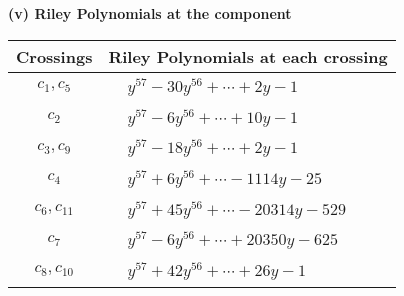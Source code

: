 \documentclass[1p]{elsarticle_modified}
\theoremstyle{definition}
\begin{document}
\newpage\renewcommand{\arraystretch}{1}
\flushleft \textbf{(v) Riley Polynomials at the component}\newline \\
\begin{tabular}{m{50pt}|m{274pt}}
Crossings & \hspace{64pt}Riley Polynomials at each crossing \\
\hline $$\begin{aligned}c_{1},c_{5}\end{aligned}$$&$\begin{aligned}
&y^{57}-30 y^{56}+\cdots+2 y-1
\end{aligned}$\\
\hline $$\begin{aligned}c_{2}\end{aligned}$$&$\begin{aligned}
&y^{57}-6 y^{56}+\cdots+10 y-1
\end{aligned}$\\
\hline $$\begin{aligned}c_{3},c_{9}\end{aligned}$$&$\begin{aligned}
&y^{57}-18 y^{56}+\cdots+2 y-1
\end{aligned}$\\
\hline $$\begin{aligned}c_{4}\end{aligned}$$&$\begin{aligned}
&y^{57}+6 y^{56}+\cdots-1114 y-25
\end{aligned}$\\
\hline $$\begin{aligned}c_{6},c_{11}\end{aligned}$$&$\begin{aligned}
&y^{57}+45 y^{56}+\cdots-20314 y-529
\end{aligned}$\\
\hline $$\begin{aligned}c_{7}\end{aligned}$$&$\begin{aligned}
&y^{57}-6 y^{56}+\cdots+20350 y-625
\end{aligned}$\\
\hline $$\begin{aligned}c_{8},c_{10}\end{aligned}$$&$\begin{aligned}
&y^{57}+42 y^{56}+\cdots+26 y-1
\end{aligned}$\\
\hline
\end{tabular}\\~\\
\end{document}
